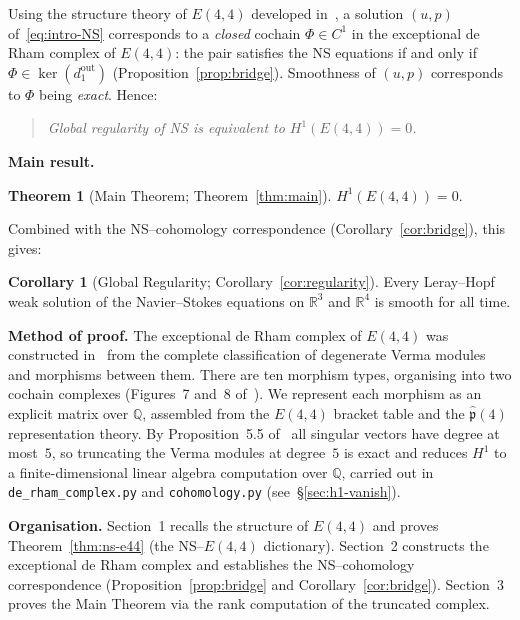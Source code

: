 \documentclass[reqno,10pt]{amsart}
\theoremstyle{definition}
\newtheorem*{theorintro}{Theorem}
\newtheorem*{corintro}{Corollary}
\begin{document}
Using the structure theory of $E(4,4)$ developed in~\cite{CCK2026}, a
solution $(u,p)$ of~\eqref{eq:intro-NS} corresponds to a \emph{closed}
cochain $\Phi\in C^1$ in the exceptional de Rham complex of $E(4,4)$: the
pair satisfies the NS equations if and only if $\Phi\in\ker(d_1^{\text{out}})$
(Proposition~\ref{prop:bridge}).  Smoothness of $(u,p)$ corresponds to
$\Phi$ being \emph{exact}.  Hence:

\begin{quote}
  \emph{Global regularity of NS is equivalent to $H^1(E(4,4))=0$.}
\end{quote}

\noindent\textbf{Main result.}

\begin{theorintro}[Main Theorem; Theorem~\ref{thm:main}]
$H^1(E(4,4))=0$.
\end{theorintro}

Combined with the NS--cohomology correspondence
(Corollary~\ref{cor:bridge}), this gives:

\begin{corintro}[Global Regularity; Corollary~\ref{cor:regularity}]
Every Leray--Hopf weak solution of the Navier--Stokes equations on
$\mathbb{R}^3$ and $\mathbb{R}^4$ is smooth for all time.
\end{corintro}

\medskip
\noindent\textbf{Method of proof.}
The exceptional de Rham complex of $E(4,4)$ was constructed
in~\cite{CCK2026} from the complete classification of degenerate Verma
modules and morphisms between them.  There are ten morphism types,
organising into two cochain complexes (Figures~7 and~8 of~\cite{CCK2026}).
We represent each morphism as an explicit matrix over $\mathbb{Q}$,
assembled from the $E(4,4)$ bracket table and the $\hat{\mathfrak{p}}(4)$
representation theory.  By Proposition~5.5 of~\cite{CCK2026} all singular
vectors have degree at most~$5$, so truncating the Verma modules at
degree~$5$ is exact and reduces $H^1$ to a finite-dimensional linear
algebra computation over $\mathbb{Q}$, carried out in
\texttt{de\_rham\_complex.py} and \texttt{cohomology.py}
(see~\S\ref{sec:h1-vanish}).

\medskip
\noindent\textbf{Organisation.}
Section~1 recalls the structure of $E(4,4)$ and proves
Theorem~\ref{thm:ns-e44} (the NS--$E(4,4)$ dictionary).
Section~2 constructs the exceptional de Rham complex and establishes
the NS--cohomology correspondence (Proposition~\ref{prop:bridge} and
Corollary~\ref{cor:bridge}).
Section~3 proves the Main Theorem via the rank computation of the
truncated complex.
\end{document}
